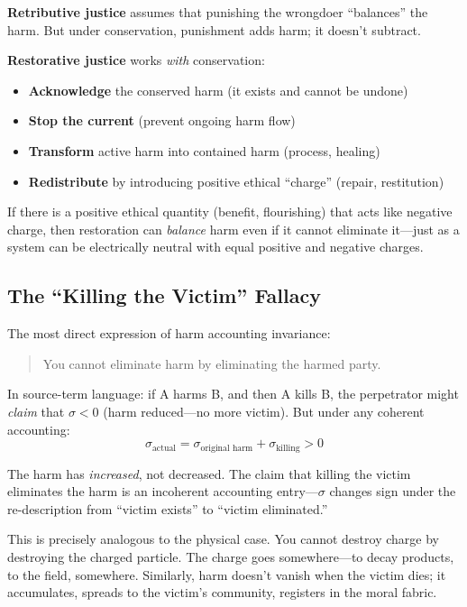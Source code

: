 \documentclass[12pt,letterpaper]{article}
\theoremstyle{definition}
\theoremstyle{remark}
\begin{document}
\textbf{Retributive justice} assumes that punishing the wrongdoer ``balances'' the harm. But under conservation, punishment adds harm; it doesn't subtract.

\textbf{Restorative justice} works \textit{with} conservation:
\begin{itemize}
    \item \textbf{Acknowledge} the conserved harm (it exists and cannot be undone)
    \item \textbf{Stop the current} (prevent ongoing harm flow)
    \item \textbf{Transform} active harm into contained harm (process, healing)
    \item \textbf{Redistribute} by introducing positive ethical ``charge'' (repair, restitution)
\end{itemize}

If there is a positive ethical quantity (benefit, flourishing) that acts like negative charge, then restoration can \textit{balance} harm even if it cannot eliminate it---just as a system can be electrically neutral with equal positive and negative charges.

\subsection{The ``Killing the Victim'' Fallacy}

The most direct expression of harm accounting invariance:
\begin{quote}
You cannot eliminate harm by eliminating the harmed party.
\end{quote}

In source-term language: if A harms B, and then A kills B, the perpetrator might \textit{claim} that $\sigma < 0$ (harm reduced---no more victim). But under any coherent accounting:
\begin{equation}
\sigma_{\text{actual}} = \sigma_{\text{original harm}} + \sigma_{\text{killing}} > 0
\end{equation}

The harm has \textit{increased}, not decreased. The claim that killing the victim eliminates the harm is an incoherent accounting entry---$\sigma$ changes sign under the re-description from ``victim exists'' to ``victim eliminated.''

This is precisely analogous to the physical case. You cannot destroy charge by destroying the charged particle. The charge goes somewhere---to decay products, to the field, somewhere. Similarly, harm doesn't vanish when the victim dies; it accumulates, spreads to the victim's community, registers in the moral fabric.
\end{document}
